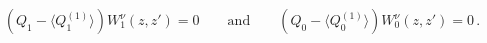 \begin{equation}
\left(Q_{1}-\langle Q_{1}^{(1)}\rangle\right) W^{\nu}_{1}(z,z')=0
\label{eq:tp1}\qquad\mbox{and}\qquad\left(Q_{0}-\langle
Q_{0}^{(1)}\rangle\right)W^{\nu}_{0}(z,z')=0\, .
\end{equation}

